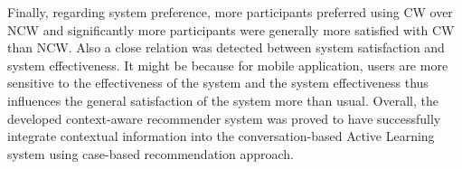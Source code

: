 Finally, regarding system preference, more participants preferred using CW over NCW and significantly more participants were generally more satisfied with CW than NCW. Also a close relation was detected between system satisfaction and system effectiveness. It might be because for mobile application, users are more sensitive to the effectiveness of the system and the system effectiveness thus influences the general satisfaction of the system more than usual. Overall, the developed context-aware recommender system was proved to have successfully integrate contextual information into the conversation-based Active Learning system using case-based recommendation approach. 

















































